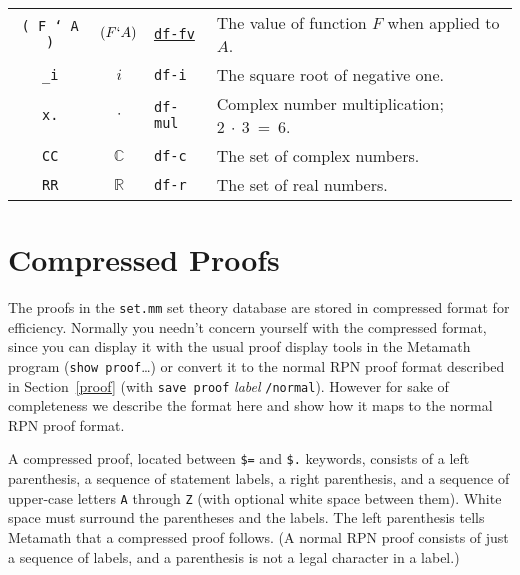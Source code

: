 {\begin{longtabu}   { @{} c c l X }
\texttt{( F ` A )} & $ ( F ` A ) $ &
  \hyperref[df-fv]{\texttt{df-fv}} &
  The value of function $F$ when applied to $A$. \\
\texttt{\_i} & $ i $ &
  \texttt{df-i} &
  The square root of negative one. \\
\texttt{x.} & $ \cdot $ &
  \texttt{df-mul} &
  Complex number multiplication; $2~\cdot~3~=~6$. \\
\texttt{CC} & $ \mathbb{C} $ &
  \texttt{df-c} &
  The set of complex numbers. \\
\texttt{RR} & $ \mathbb{R} $ &
  \texttt{df-r} &
  The set of real numbers. \\
\end{longtabu}
} %

\chapter{Compressed Proofs}
\label{compressed}

The proofs in the \texttt{set.mm} set theory database are stored in compressed
format for efficiency.  Normally you needn't concern yourself with the
compressed format, since you can display it with the usual proof display tools
in the Metamath program (\texttt{show proof}\ldots) or convert it to the normal
RPN proof format described in Section~\ref{proof} (with \texttt{save proof}
{\em label} \texttt{/normal}).  However for sake of completeness we describe the
format here and show how it maps to the normal RPN proof format.

A compressed proof, located between \texttt{\$=} and \texttt{\$.} keywords, consists
of a left parenthesis, a sequence of statement labels, a right parenthesis,
and a sequence of upper-case letters \texttt{A} through \texttt{Z} (with optional
white space between them).  White space must surround the parentheses
and the labels.  The left parenthesis tells Metamath that a
compressed proof follows.  (A normal RPN proof consists of just a sequence of
labels, and a parenthesis is not a legal character in a label.)

